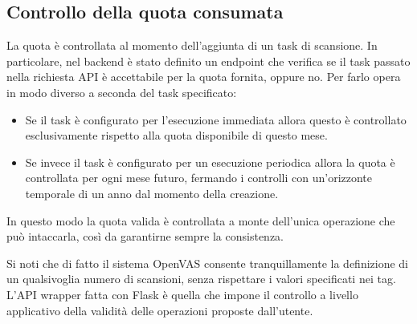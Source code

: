 \subsection{Controllo della quota consumata}
La quota è controllata al momento dell'aggiunta di un task di scansione. In particolare, nel backend è stato definito un endpoint che verifica se il task passato nella richiesta API è accettabile per la quota fornita, oppure no. Per farlo opera in modo diverso a seconda del task specificato:
\begin{itemize}
    \item Se il task è configurato per l'esecuzione immediata allora questo è controllato esclusivamente rispetto alla quota disponibile di questo mese.
    \item Se invece il task è configurato per un esecuzione periodica allora la quota è controllata per ogni mese futuro, fermando i controlli con un'orizzonte temporale di un anno dal momento della creazione.
\end{itemize}
In questo modo la quota valida è controllata a monte dell'unica operazione che può intaccarla, così da garantirne sempre la consistenza.

Si noti che di fatto il sistema OpenVAS consente tranquillamente la definizione di un qualsivoglia numero di scansioni, senza rispettare i valori specificati nei tag. L'API wrapper fatta con Flask è quella che impone il controllo a livello applicativo della validità delle operazioni proposte dall'utente.

